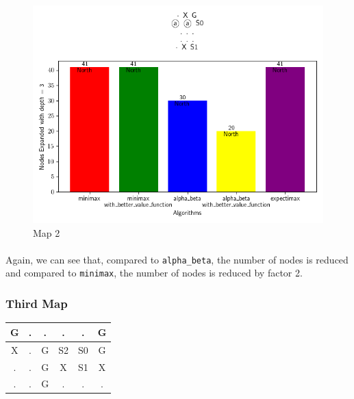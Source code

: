 \documentclass{article}
\begin{document}
    
\begin{figure}[h]
    \centering
    \includegraphics[width=\textwidth]{media/map2023_10_29_13_56_42.png}
    \caption{Map 2}
    \label{fig:image2}
\end{figure}
\vspace{1em}

\paragraph{}
Again, we can see that, compared to \texttt{alpha\_beta},
the number of nodes is reduced and compared to \texttt{minimax},
the number of nodes is reduced by factor 2.


\newpage
\subsubsection{Third Map}

\begin{table}[h]
    \centering
    \begin{tabular}{|c|c|c|c|c|c|}
    \hline
    G & . & . & . & . & G \\
    \hline
    X & . & G & S2 & S0 & G \\
    \hline
    . & . & G & X & S1 & X \\
    \hline
    . & . & G & . & . & . \\
    \hline
    \end{tabular}
    \label{tab:your_grid}
    \end{table}
    
\end{document}
